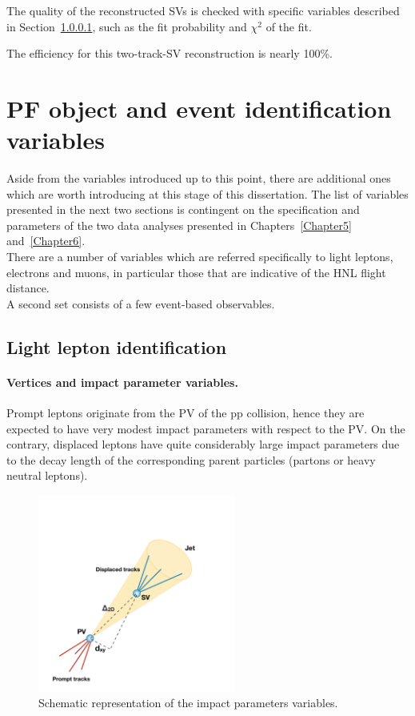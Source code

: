 The quality of the reconstructed SVs is checked with specific
variables described in Section~\ref{sec:c2IP}, such as the fit
probability and $\chi^2$ of the fit. 

The efficiency for this two-track-SV reconstruction is nearly 100\%.


\section{PF object and event identification
  variables}\label{sec:c2variables}
Aside from the variables introduced up to this point, there are additional
ones which are worth introducing at this stage of this dissertation. 
The list of variables presented in the next two sections is
contingent on the specification and parameters of the two data analyses presented in Chapters~\ref{Chapter5}
and~\ref{Chapter6}.\\
There are a number of variables which are referred specifically to light
leptons, electrons and muons, in particular those that are indicative
of the HNL flight distance.\\
A second set consists of a few event-based observables. 



\subsection*{Light lepton
  identification} \label{sec:c2leptonvariables}

\paragraph{Vertices and impact parameter variables.} \label{sec:c2IP}
Prompt leptons originate from the PV of the pp collision, hence they
are expected to have very modest impact parameters with respect to the
PV. On the contrary, displaced leptons have
quite considerably large impact parameters due to the decay length of the
corresponding parent particles (partons or heavy neutral leptons).

\begin{figure}[h!]
\centering
  \includegraphics[clip,trim=1cm 0cm 3cm 4cm, width=0.58\textwidth]{Figures/c2/grafico.pdf}
  \caption{Schematic representation of the impact parameters variables.}
  \label{fig:impact}
\end{figure}

